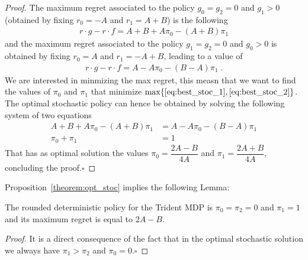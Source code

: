 \begin{proof}
The maximum regret associated to the policy $g_0=g_2=0$ and $g_1 > 0$  (obtained by fixing $r_0 = -A$ and $r_1 = A+B$) is the following
\begin{align}
r \cdot g - r \cdot f = A + B +A \pi_0 -(A+B)\pi_1 \label{eq:best_stoc_1}
\end{align}   
and the maximum regret associated to the policy $g_1=g_2=0$ and $g_0 > 0$ is obtained by fixing $r_0 = A$ and $r_1 = -A+B$, leading to a value of
\begin{align}
r \cdot g - r \cdot f = A - A \pi_0 -(B-A)\pi_1 \label{eq:best_stoc_2}\;.
\end{align}   
We are interested in minmizing the max regret, this measn that we want to find the values of $\pi_0$ and $\pi_1$ that minimize $\max \{\eqref{eq:best_stoc_1}, \eqref{eq:best_stoc_2}\}$. The optimal stochastic policy can hence be obtained by solving the following system of two equations 
\begin{align*}
A + B +A \pi_0 -(A+B)\pi_1 &= A - A \pi_0 -(B-A)\pi_1\\
\pi_0+\pi_1 &= 1
\end{align*} 
That has as optimal solution the values $\pi_{0}=\dfrac{2A - B}{4A}$ and $\pi_{1}=\dfrac{2A + B}{4A}$, concluding the proof.$\square$
\end{proof}


Proposition~\ref{theorem:opt_stoc} implies the following Lemma:
\begin{lemma}\label{lemma:heur_policy}
The rounded deterministic policy for the Trident MDP is $\pi_0 =\pi_2 = 0$ and $\pi_1 = 1$ and its maximum regret is equal to $2A-B$.
\end{lemma}
\begin{proof}
It is a direct consequence of the fact that in the optimal stochastic solution we always have $\pi_1 > \pi_2$ and $\pi_0 = 0$.$\square$
\end{proof}



